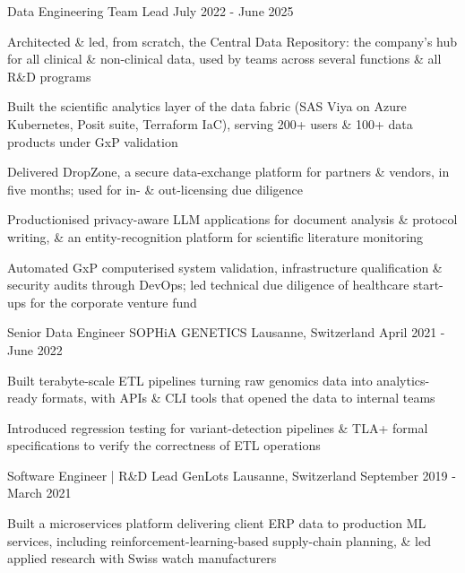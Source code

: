 \begin{cventries}
\cventry
    {Data Engineering Team Lead}
    {}
    {}
    {July 2022 - June 2025}
    {
      \begin{cvitems}
        \item Architected \& led, from scratch, the Central Data Repository: the company's hub for all clinical \& non-clinical data, used by teams across several functions \& all R\&D programs
        \item Built the scientific analytics layer of the data fabric (SAS Viya on Azure Kubernetes, Posit suite, Terraform IaC), serving 200+ users \& 100+ data products under GxP validation
        \item Delivered DropZone, a secure data-exchange platform for partners \& vendors, in five months; used for in- \& out-licensing due diligence
        \item Productionised privacy-aware LLM applications for document analysis \& protocol writing, \& an entity-recognition platform for scientific literature monitoring
        \item Automated GxP computerised system validation, infrastructure qualification \& security audits through DevOps; led technical due diligence of healthcare start-ups for the corporate venture fund
      \end{cvitems}
    }

\cventry
    {Senior Data Engineer}
    {SOPHiA GENETICS}
    {Lausanne, Switzerland}
    {April 2021 - June 2022}
    {
      \begin{cvitems}
        \item Built terabyte-scale ETL pipelines turning raw genomics data into analytics-ready formats, with APIs \& CLI tools that opened the data to internal teams
        \item Introduced regression testing for variant-detection pipelines \& TLA+ formal specifications to verify the correctness of ETL operations
      \end{cvitems}
    }

\cventry
    {Software Engineer | R\&D Lead}
    {GenLots}
    {Lausanne, Switzerland}
    {September 2019 - March 2021}
    {
      \begin{cvitems}
        \item Built a microservices platform delivering client ERP data to production ML services, including reinforcement-learning-based supply-chain planning, \& led applied research with Swiss watch manufacturers
      \end{cvitems}
    }


\end{cventries}
